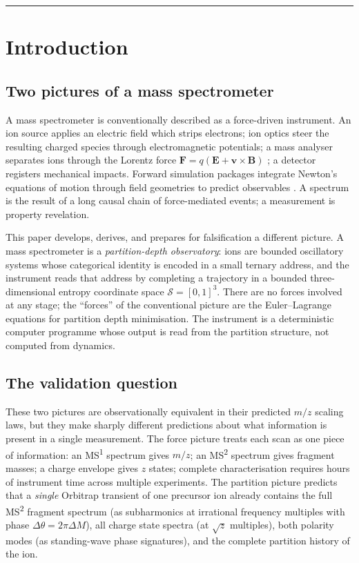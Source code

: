 \documentclass[twocolumn,10pt,a4paper]{article}
\theoremstyle{thmstyle}
\theoremstyle{definition}
\theoremstyle{remark}
\newcommand{\Sspace}{\mathcal{S}}
\begin{document}
\tableofcontents
\bigskip\hrule\bigskip

\section{Introduction}
\label{sec:intro}

\subsection{Two pictures of a mass spectrometer}

A mass spectrometer is conventionally described as a force-driven
instrument. An ion source applies an electric field which strips
electrons; ion optics steer the resulting charged species through
electromagnetic potentials; a mass analyser separates ions through the
Lorentz force $\mathbf{F}=q(\mathbf{E}+\mathbf{v}\times\mathbf{B})$
\citep{griffiths2017}; a detector registers mechanical impacts.
Forward simulation packages integrate Newton's equations of motion
through field geometries to predict observables \citep{dahl2000}. A
spectrum is the result of a long causal chain of force-mediated
events; a measurement is property revelation.

This paper develops, derives, and prepares for falsification a
different picture. A mass spectrometer is a \emph{partition-depth
observatory}: ions are bounded oscillatory systems whose categorical
identity is encoded in a small ternary address, and the instrument
reads that address by completing a trajectory in a bounded
three-dimensional entropy coordinate space
$\Sspace=[0,1]^{3}$. There are no forces involved at any stage; the
``forces'' of the conventional picture are the Euler--Lagrange
equations for partition depth minimisation. The instrument is a
deterministic computer programme whose output is read from the
partition structure, not computed from dynamics.

\subsection{The validation question}

These two pictures are observationally equivalent in their predicted
$m/z$ scaling laws, but they make sharply different predictions about
what information is present in a single measurement. The force picture
treats each scan as one piece of information: an MS\textsuperscript{1}
spectrum gives $m/z$; an MS\textsuperscript{2} spectrum gives fragment
masses; a charge envelope gives $z$ states; complete characterisation
requires hours of instrument time across multiple experiments. The
partition picture predicts that a \emph{single} Orbitrap transient of
one precursor ion already contains the full MS\textsuperscript{2}
fragment spectrum (as subharmonics at irrational frequency multiples
with phase $\Delta\theta=2\pi\Delta M$), all charge state spectra (at
$\sqrt{z}$ multiples), both polarity modes (as standing-wave phase
signatures), and the complete partition history of the ion.
\end{document}
